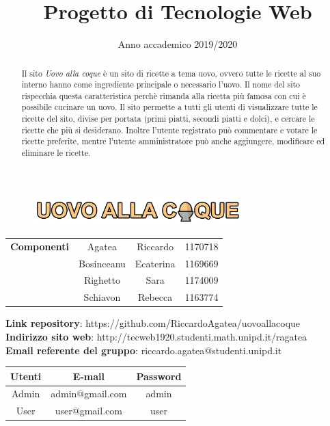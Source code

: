 
\title{Progetto di Tecnologie Web}
\author{}
\date{Anno accademico 2019/2020}


	\maketitle
	\begin{figure}[H]
		\centering
		\includegraphics[width=8cm]{img/logo.png}
	\end{figure}
	\begin{table}[H]
		\centering
		\begin{tabular}{c|c c c}
			\textbf{Componenti}&Agatea&Riccardo&1170718\\
			&Bosinceanu&Ecaterina&1169669\\
			&Righetto&Sara&1174009\\
			&Schiavon&Rebecca&1163774\\
		\end{tabular}
	\end{table}

	\begin{center}
		\textbf{Link repository}: https://github.com/RiccardoAgatea/uovoallacoque\\
		\textbf{Indirizzo sito web}: http://tecweb1920.studenti.math.unipd.it/ragatea\\
		\textbf{Email referente del gruppo}: riccardo.agatea@studenti.unipd.it
	\end{center}

	\begin{table}[H]
		\centering
		\begin{tabular}{c|c c}
			\textbf{Utenti} & \textbf{E-mail} & \textbf{Password} \\
			\hline
			Admin & admin@gmail.com & admin \\
			User & user@gmail.com & user \\
		\end{tabular}
	\end{table}
	\newpage
	\tableofcontents
	\newpage
	\renewcommand{\abstractname}{Abstract}
	\begin{abstract}
		Il sito \emph{Uovo alla coque} è un sito di ricette a tema uovo, ovvero tutte le ricette al suo interno hanno come ingrediente principale o necessario l'uovo. Il nome del sito rispecchia questa caratteristica perchè rimanda alla ricetta più famosa con cui è possibile cucinare un uovo. \newline
		Il sito permette a tutti gli utenti di visualizzare tutte le ricette del sito, divise per portata (primi piatti, secondi piatti e dolci), e cercare le ricette che più si desiderano. Inoltre l'utente registrato può commentare e votare le ricette preferite, mentre l'utente amministratore può anche aggiungere, modificare ed eliminare le ricette.
	\end{abstract}
	\newpage
	
	\newpage
	
	\newpage
	
	\newpage
	
	\newpage
	

